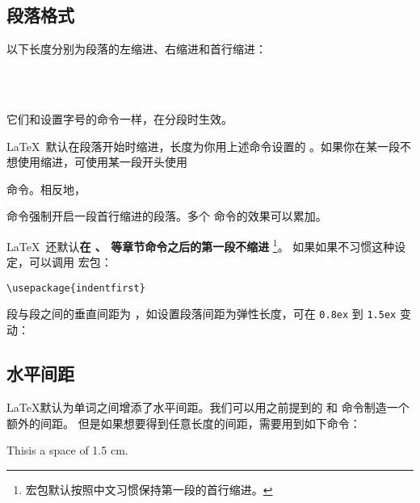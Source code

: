 \subsection{段落格式}\label{subsec:par-shape}

以下长度分别为段落的左缩进、右缩进和首行缩进：
\begin{command}
\marg*{20pt}  \\
\marg*{20pt} \\
\marg*{2em}
\end{command}

它们和设置字号的命令一样，在分段时生效。

\LaTeX\ 默认在段落开始时缩进，长度为你用上述命令设置的 。如果你在某一段不想使用缩进，可使用某一段开头使用
\begin{command}
\end{command}
命令。相反地，
\begin{command}
\end{command}
命令强制开启一段首行缩进的段落。多个  命令的效果可以累加。

\LaTeX\ 还默认\textbf{在 、 等章节命令之后的第一段不缩进}%
\footnote{ 宏包默认按照中文习惯保持第一段的首行缩进。}。
如果如果不习惯这种设定，可以调用  宏包：
\begin{verbatim}
\usepackage{indentfirst}
\end{verbatim}

段与段之间的垂直间距为 ，如设置段落间距为弹性长度，可在 \texttt{0.8ex} 到 \texttt{1.5ex} 变动：
\begin{command}
\end{command}

\subsection{水平间距}\label{subsec:hspace}

\LaTeX 默认为单词之间增添了水平间距。我们可以用之前提到的  和  命令制造一个额外的间距。
但是如果想要得到任意长度的间距，需要用到如下命令：
\begin{command}
\end{command}
\begin{example}
This\hspace{1.5cm}is a space
of 1.5 cm.
\end{example}

